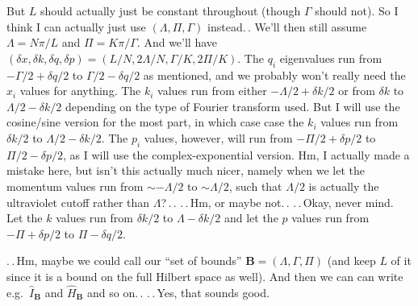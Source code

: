 \documentclass{report}
\begin{document}
But $L$ should actually just be constant throughout (though $\Gamma$ should not). So I think I can actually just use $(\Lambda, \Pi, \Gamma)$ instead.\,. We'll then still assume $\Lambda = N \pi / L$ and $\Pi = K \pi / \Gamma$. And we'll have $(\delta x, \delta k, \delta q, \delta p) = (L/N, 2\Lambda / N, \Gamma / K, 2\Pi / K)$. The $q_i$ eigenvalues run from $-\Gamma/2 + \delta q /2$ to $\Gamma/2 - \delta q / 2$ as mentioned, and we probably won't really need the $x_i$ values for anything. The $k_i$ values run from either $-\Lambda/2 + \delta k /2$ or from $\delta k$ to $\Lambda/2 - \delta k / 2$ depending on the type of Fourier transform used. But I will use the cosine/sine version for the most part, in which case case the $k_i$ values run from $\delta k / 2$ to $\Lambda/2 - \delta k / 2$. The $p_i$ values, however, will run from $-\Pi/2 + \delta p / 2$ to $\Pi/2 - \delta p / 2$, as I will use the complex-exponential version. Hm, I actually made a mistake here, but isn't this actually much nicer, namely when we let the momentum values run from $\sim -\Lambda / 2$ to $\sim \Lambda / 2$, such that $\Lambda/2$ is actually the ultraviolet cutoff rather than $\Lambda$?\,.\,. .\,.\,Hm, or maybe not.\,. .\,.\,Okay, never mind. Let the $k$ values run from $\delta k / 2$ to $\Lambda - \delta k / 2$ and let the $p$ values run from $-\Pi + \delta p /2$ to $\Pi - \delta q / 2$. 

.\,.\,Hm, maybe we could call our ``set of bounds'' $\boldsymbol B=(\Lambda, \Gamma, \Pi)$ (and keep $L$ of it since it is a bound on the full Hilbert space as well). And then we can can write e.g.\ $\hat I_{\boldsymbol B}$ and $\hat H_{\boldsymbol B}$ and so on.\,. .\,.\,Yes, that sounds good. 
\end{document}

